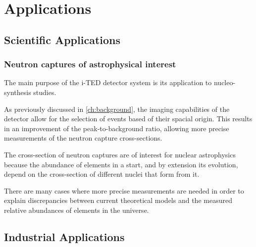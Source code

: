 \chapter{Applications}\label{ch:applications}

\section{Scientific Applications}

\subsection{Neutron captures of astrophysical interest}

The main purpose of the \ac{i-TED} detector system is its application to nucleo-synthesis studies.

As previously discussed in \ref{ch:background}, the imaging capabilities of the detector allow for the selection of events based of their spacial origin. This results in an improvement of the peak-to-background ratio, allowing more precise measurements of the neutron capture cross-sections.

The cross-section of neutron captures are of interest for nuclear astrophysics because the abundance of elements in a start, and by extension its evolution, depend on the cross-section of different nuclei that form from it.

There are many cases where more precise measurements are needed in order to explain discrepancies between current theoretical models and the measured relative abundances of elements in the universe.

\section{Industrial Applications}

